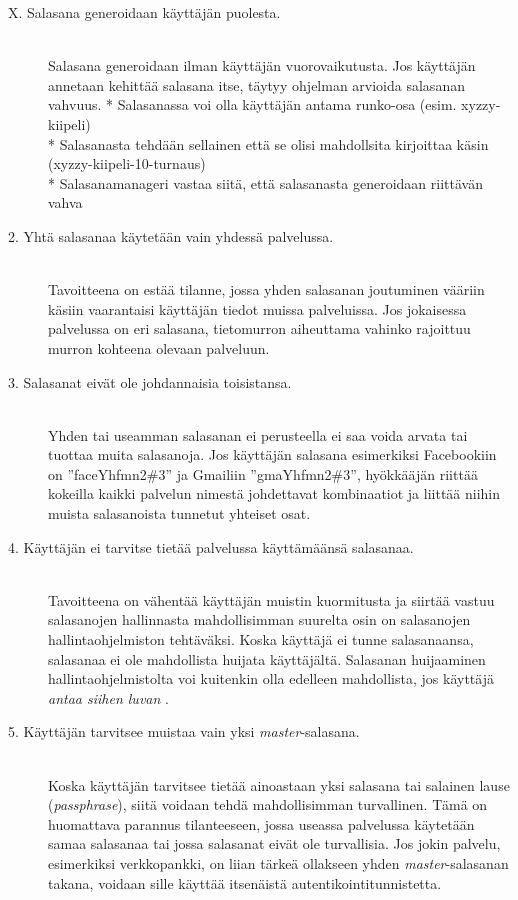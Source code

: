 \documentclass[english,gradu]{tktltiki}
\begin{document}
\begin{description}
           \item[X. Salasana generoidaan käyttäjän puolesta.] \hfill \\
           Salasana generoidaan ilman käyttäjän vuorovaikutusta.
           Jos käyttäjän annetaan kehittää salasana itse, täytyy ohjelman arvioida salasanan vahvuus.
            * Salasanassa voi olla käyttäjän antama runko-osa (esim. xyzzy-kiipeli) \\
            * Salasanasta tehdään sellainen että se olisi mahdollsita kirjoittaa käsin (xyzzy-kiipeli-10-turnaus) \\
            * Salasanamanageri vastaa siitä, että salasanasta generoidaan riittävän vahva \\

           \item[2. Yhtä salasanaa käytetään vain yhdessä palvelussa.] \hfill \\
            Tavoitteena on estää tilanne, jossa yhden salasanan joutuminen vääriin käsiin vaarantaisi käyttäjän tiedot
            muissa palveluissa. Jos jokaisessa palvelussa on eri salasana, tietomurron aiheuttama vahinko rajoittuu
            murron kohteena olevaan palveluun.

           \item[3. Salasanat eivät ole johdannaisia toisistansa.] \hfill \\
             Yhden tai useamman salasanan ei perusteella ei saa voida arvata tai tuottaa muita salasanoja. Jos käyttäjän
             salasana esimerkiksi Facebookiin on ''faceYhfmn2\#3'' ja Gmailiin ''gmaYhfmn2\#3'', hyökkääjän riittää
             kokeilla kaikki palvelun nimestä johdettavat kombinaatiot ja liittää niihin muista salasanoista tunnetut
             yhteiset osat.

           \item[4. Käyttäjän ei tarvitse tietää palvelussa käyttämäänsä salasanaa.] \hfill \\
             Tavoitteena on vähentää käyttäjän muistin kuormitusta ja siirtää vastuu salasanojen hallinnasta
             mahdollisimman suurelta osin on salasanojen hallintaohjelmiston tehtäväksi.
             Koska käyttäjä ei tunne salasanaansa, salasanaa ei ole mahdollista huijata käyttäjältä.
             Salasanan huijaaminen hallintaohjelmistolta voi kuitenkin olla edelleen mahdollista, jos käyttäjä
             \emph{antaa siihen luvan} \cite{why_phishing_works_06}.

           \item[5. Käyttäjän tarvitsee muistaa vain yksi \emph{master}-salasana.] \hfill \\
             Koska käyttäjän tarvitsee tietää ainoastaan yksi salasana tai salainen lause (\emph{passphrase}), siitä
             voidaan tehdä mahdollisimman turvallinen. Tämä on huomattava parannus tilanteeseen, jossa useassa palvelussa
             käytetään samaa salasanaa tai jossa salasanat eivät ole turvallisia. Jos jokin palvelu, esimerkiksi
             verkkopankki, on liian tärkeä ollakseen yhden \emph{master}-salasanan takana, voidaan sille käyttää
             itsenäistä autentikointitunnistetta.

         \end{description}
\end{document}
